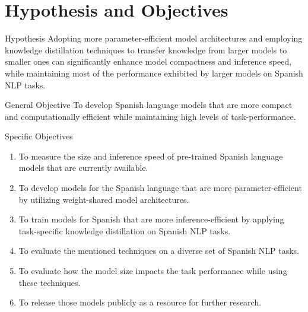 \documentclass[aspectratio=169,xcolor=dvipsnames]{beamer}
\begin{document}
\section{Hypothesis and Objectives}
\begin{frame}{Hypothesis}
\centering
\Large{Adopting more parameter-efficient model architectures and employing knowledge distillation techniques to transfer knowledge from larger models to smaller ones can significantly enhance model compactness and inference speed, while maintaining most of the performance exhibited by larger models on Spanish NLP tasks.}
\end{frame}
\begin{frame}{General Objective}
\centering
\huge{To develop \alert{Spanish language models} that are more \alert{compact} and \alert{computationally efficient} while maintaining high levels of task-performance.}
\end{frame}
\begin{frame}{Specific Objectives}
\begin{enumerate}
    \item To measure the size and inference speed of pre-trained Spanish language models that are currently available.
    \item To develop models for the Spanish language that are more parameter-efficient by utilizing weight-shared model architectures.
    \item To train models for Spanish that are more inference-efficient by applying task-specific knowledge distillation on Spanish NLP tasks.
    \item To evaluate the mentioned techniques on a diverse set of Spanish NLP tasks.
    \item To evaluate how the model size impacts the task performance while using these techniques.
    \item To release those models publicly as a resource for further research.
\end{enumerate}
\end{frame}








\end{document}
